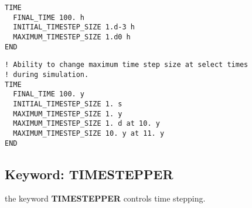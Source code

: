 
\begin{mdframed}

\begin{verbatim}
TIME
  FINAL_TIME 100. h
  INITIAL_TIMESTEP_SIZE 1.d-3 h
  MAXIMUM_TIMESTEP_SIZE 1.d0 h
END
\end{verbatim}

\begin{verbatim}
! Ability to change maximum time step size at select times 
! during simulation.
TIME
  FINAL_TIME 100. y
  INITIAL_TIMESTEP_SIZE 1. s
  MAXIMUM_TIMESTEP_SIZE 1. y
  MAXIMUM_TIMESTEP_SIZE 1. d at 10. y
  MAXIMUM_TIMESTEP_SIZE 10. y at 11. y
END
\end{verbatim}

\end{mdframed}

\hyperlink{target_key}{\return}


\newpage
\protect\hypertarget{target_timestep}{}

\subsection{Keyword: TIMESTEPPER}

 the keyword {\bf TIMESTEPPER} controls time stepping.

